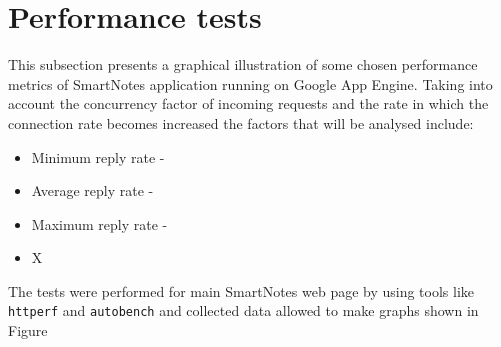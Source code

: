 \section{Performance tests}\label{sec:performance}
This subsection presents a graphical illustration of some chosen performance metrics of SmartNotes application running on Google App Engine. Taking into account the concurrency factor of incoming requests and the rate in which the  connection rate becomes increased the factors that will be analysed include:
\begin{itemize}
	\item{Minimum reply rate - }
	\item{Average reply rate - }
	\item{Maximum reply rate -}
	\item{X}
\end{itemize}
The tests were performed for main SmartNotes web page by using tools like \texttt{httperf} and \texttt{autobench} and collected data allowed to make graphs shown in Figure
